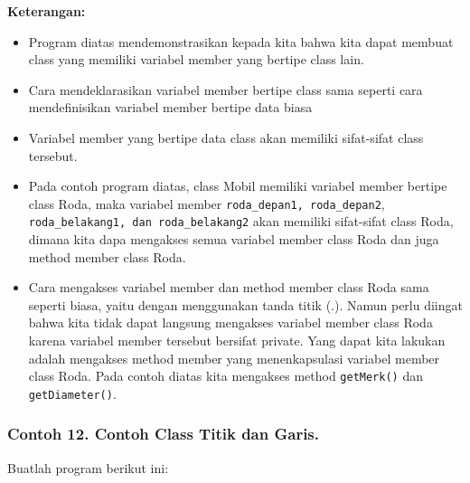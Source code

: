\textbf{Keterangan:}

\begin{itemize}
\tightlist
\item
  Program diatas mendemonstrasikan kepada kita bahwa kita dapat membuat
  class yang memiliki variabel member yang bertipe class lain.
\item
  Cara mendeklarasikan variabel member bertipe class sama seperti cara
  mendefinisikan variabel member bertipe data biasa
\item
  Variabel member yang bertipe data class akan memiliki sifat-sifat
  class tersebut.
\item
  Pada contoh program diatas, class Mobil memiliki variabel member
  bertipe class Roda, maka variabel member
  \texttt{roda\_depan1,\ roda\_depan2},
  \texttt{roda\_belakang1,\ dan\ roda\_belakang2} akan memiliki
  sifat-sifat class Roda, dimana kita dapa mengakses semua variabel
  member class Roda dan juga method member class Roda.
\item
  Cara mengakses variabel member dan method member class Roda sama
  seperti biasa, yaitu dengan menggunakan tanda titik (.). Namun perlu
  diingat bahwa kita tidak dapat langsung mengakses variabel member
  class Roda karena variabel member tersebut bersifat private. Yang
  dapat kita lakukan adalah mengakses method member yang menenkapsulasi
  variabel member class Roda. Pada contoh diatas kita mengakses method
  \texttt{getMerk()} dan \texttt{getDiameter()}.
\end{itemize}

\subsubsection*{Contoh 12. Contoh Class Titik dan Garis.}

Buatlah program berikut ini:

